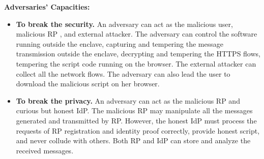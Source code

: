 \vspace{1mm}\noindent\textbf{Adversaries' Capacities: }
\begin{itemize}
\item \noindent\textbf{To break the security.}
An adversary can act as the malicious user, malicious RP , and external attacker. 
The adversary can control the software running outside the enclave, capturing and tempering the message transmission outside the enclave, decrypting and tempering the HTTPS flows, tempering the script code running on the browser. 
The external attacker can collect all the network flows. The adversary can also lead the user to download the malicious script on her browser.

\item \noindent\textbf{To break the privacy.}
An adversary can act as the malicious RP and curious but honest IdP. 
The malicious RP may manipulate  all the messages generated and transmitted by RP.
However, the honest IdP must process the requests of RP registration and identity proof correctly, provide honest script, and never collude with others.
Both RP and IdP can store and analyze the received messages.

\end{itemize}

